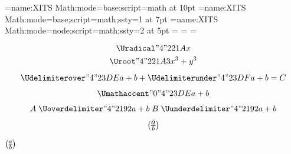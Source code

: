 

\font\4={name:XITS Math:mode=base;script=math} at 10pt
\font\5={name:XITS Math:mode=base;script=math;ssty=1} at 7pt
\font\6={name:XITS Math:mode=node;script=math;ssty=2} at 5pt
=\4 =\5 =\6

$$\Uradical "4 "221A {x}$$
$$\Uroot    "4 "221A {3}{x^3+y^3}$$

$$
  \Udelimiterover  "4 "23DE {a+b}
+ \Udelimiterunder "4 "23DF {a+b} = C
$$

$$
  \Umathaccent    "0 "4 "23DE {a+b}
$$

$$
A \mathrel{\Uoverdelimiter  "4 "2192 {a+b}}
B \mathrel{\Uunderdelimiter "4 "2192 {a+b}}
$$

$$
a \overwithdelims() b
$$


\centerline{$ a \overwithdelims() b $}

\bye

